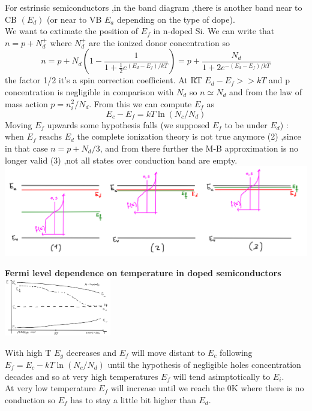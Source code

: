 For estrinsic semiconductors ,in the band diagram ,there is another band near to CB $(E_d)$ (or near to VB $E_a$ depending on the type of dope).\\
We want to extimate the position of $E_f$ in n-doped Si. We can write that $n=p+N_d^+$ where $N_d^+$ are the ionized donor concentration so
\begin{equation}
n=p+N_d(1-\frac{1}{1+\frac{1}{2} e^{(E_d-E_f)/kT}})=p+\frac{N_d}{1+2e^{-(E_d-E_f)/kT}}
\end{equation}
the factor 1/2 it's a spin correction coefficient. At RT $E_d-E_f>>kT$ and p concentration is negligible in comparison with $N_d$ so $n\simeq N_d$ and from the law of mass action $p=n_i^2/N_d$. From this we can compute $E_f$ as 
\begin{equation}
E_c-E_f=kT\ln (N_c/N_d)
\end{equation}
Moving $E_f$ upwards some hypothesis falls (we supposed $E_f$ to be under $E_d$) : when $E_f$ reachs $E_d$ the complete ionization theory is not true anymore (2) ,since in that case $n=p+N_d/3$, and from there further the M-B approximation is no longer valid (3) ,not all states over conduction band are empty.\\

\centering
\includegraphics[width=1\textwidth]{complete_ion.png}\\
\raggedright


{\bf Fermi level dependence on temperature in doped semiconductors}\\ 


\centering
\includegraphics[width=0.35\textwidth]{E_f(T).png}\\
\raggedright


With high T $E_g$ decreases and $E_f$ will move distant to $E_c$ following $E_f=E_c-kT\ln (N_c/N_d) $ until the hypothesis of negligible holes concentration decades and so at very high temperatures $E_f$ will tend asimptotically to $E_i$.\\
At very low temperature $E_f$ will increase until we reach the 0K where there is no conduction so $E_f$ has to stay a little bit higher than $E_d$.\\


